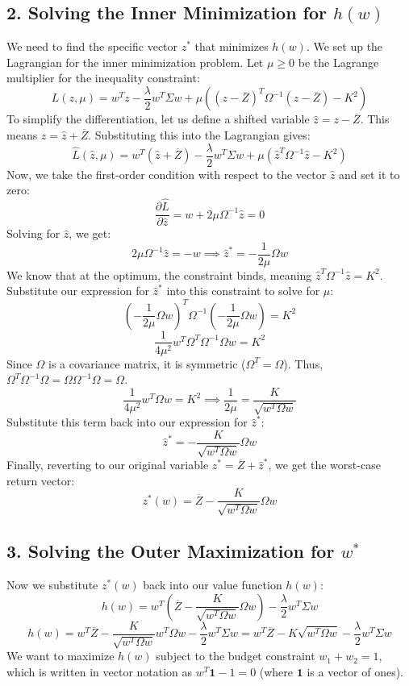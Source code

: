 \subsection*{2. Solving the Inner Minimization for $h(w)$}
We need to find the specific vector $z^*$ that minimizes $h(w)$. We set up the Lagrangian for the inner minimization problem. Let $\mu \ge 0$ be the Lagrange multiplier for the inequality constraint:
\[
L(z, \mu) = w^T z - \frac{\lambda}{2}w^T \Sigma w + \mu \left( (z - \overline{Z})^T \Omega^{-1} (z - \overline{Z}) - K^2 \right)
\]
To simplify the differentiation, let us define a shifted variable $\hat{z} = z - \overline{Z}$. This means $z = \hat{z} + \overline{Z}$. Substituting this into the Lagrangian gives:
\[
\hat{L}(\hat{z}, \mu) = w^T (\hat{z} + \overline{Z}) - \frac{\lambda}{2}w^T \Sigma w + \mu (\hat{z}^T \Omega^{-1} \hat{z} - K^2)
\]
Now, we take the first-order condition with respect to the vector $\hat{z}$ and set it to zero:
\[
\frac{\partial \hat{L}}{\partial \hat{z}} = w + 2\mu \Omega^{-1} \hat{z} = 0
\]
Solving for $\hat{z}$, we get:
\[
2\mu \Omega^{-1} \hat{z} = -w \implies \hat{z}^* = -\frac{1}{2\mu} \Omega w
\]
We know that at the optimum, the constraint binds, meaning $\hat{z}^T \Omega^{-1} \hat{z} = K^2$. Substitute our expression for $\hat{z}^*$ into this constraint to solve for $\mu$:
\[
\left( -\frac{1}{2\mu} \Omega w \right)^T \Omega^{-1} \left( -\frac{1}{2\mu} \Omega w \right) = K^2
\]
\[
\frac{1}{4\mu^2} w^T \Omega^T \Omega^{-1} \Omega w = K^2
\]
Since $\Omega$ is a covariance matrix, it is symmetric ($\Omega^T = \Omega$). Thus, $\Omega^T \Omega^{-1} \Omega = \Omega \Omega^{-1} \Omega = \Omega$.
\[
\frac{1}{4\mu^2} w^T \Omega w = K^2 \implies \frac{1}{2\mu} = \frac{K}{\sqrt{w^T \Omega w}}
\]
Substitute this term back into our expression for $\hat{z}^*$:
\[
\hat{z}^* = -\frac{K}{\sqrt{w^T \Omega w}} \Omega w
\]
Finally, reverting to our original variable $z^* = \overline{Z} + \hat{z}^*$, we get the worst-case return vector:
\[
z^*(w) = \overline{Z} - \frac{K}{\sqrt{w^T \Omega w}} \Omega w
\]

\subsection*{3. Solving the Outer Maximization for $w^*$}
Now we substitute $z^*(w)$ back into our value function $h(w)$:
\[
h(w) = w^T \left( \overline{Z} - \frac{K}{\sqrt{w^T \Omega w}} \Omega w \right) - \frac{\lambda}{2}w^T \Sigma w
\]
\[
h(w) = w^T \overline{Z} - \frac{K}{\sqrt{w^T \Omega w}} w^T \Omega w - \frac{\lambda}{2}w^T \Sigma w = w^T \overline{Z} - K\sqrt{w^T \Omega w} - \frac{\lambda}{2}w^T \Sigma w
\]
We want to maximize $h(w)$ subject to the budget constraint $w_1 + w_2 = 1$, which is written in vector notation as $w^T \mathbf{1} - 1 = 0$ (where $\mathbf{1}$ is a vector of ones).

